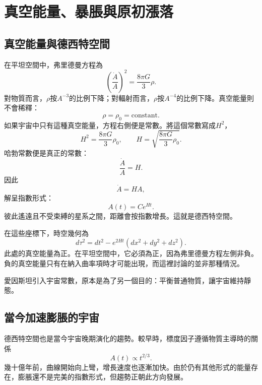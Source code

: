 \chapter{真空能量、暴脹與原初漲落}

\section{真空能量與德西特空間}

在平坦空間中，弗里德曼方程為
\begin{equation}
\left(\frac{\dot A}{A}\right)^2=\frac{8\pi G}{3}\rho.
\end{equation}
對物質而言，\(\rho\)按\(A^{-3}\)的比例下降；對輻射而言，\(\rho\)按\(A^{-4}\)的比例下降。真空能量則不會稀釋：
\begin{equation}
\rho=\rho_0=\text{constant}.
\end{equation}
如果宇宙中只有這種真空能量，方程右側便是常數。將這個常數寫成\(H^2\)，
\begin{equation}
H^2=\frac{8\pi G}{3}\rho_0,
\qquad
H=\sqrt{\frac{8\pi G}{3}\rho_0}.
\end{equation}
哈勃常數便是真正的常數：
\begin{equation}
\frac{\dot A}{A}=H.
\end{equation}
因此
\begin{equation}
\dot A=HA,
\end{equation}
解呈指數形式：
\begin{equation}
A(t)=C e^{Ht}.
\end{equation}
彼此遙遠且不受束縛的星系之間，距離會按指數增長。這就是德西特空間。

在這些座標下，時空幾何為
\begin{equation}
d\tau^2=dt^2-e^{2Ht}\left(dx^2+dy^2+dz^2\right).
\end{equation}
此處的真空能量為正。在平坦空間中，它必須為正，因為弗里德曼方程左側非負。負的真空能量只有在納入曲率項時才可能出現，而這裡討論的並非那種情況。

愛因斯坦引入宇宙常數，原本是為了另一個目的：平衡普通物質，讓宇宙維持靜態。

\section{當今加速膨脹的宇宙}

德西特空間也是當今宇宙晚期演化的趨勢。較早時，標度因子遵循物質主導時的關係
\begin{equation}
A(t)\propto t^{2/3}.
\end{equation}
幾十億年前，曲線開始向上彎，增長速度也逐漸加快。由於仍有其他形式的能量存在，膨脹還不是完美的指數形式，但趨勢正朝此方向發展。

